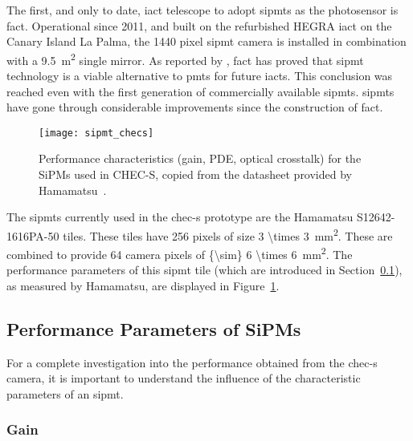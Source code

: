 The first, and only to date, \gls{iact} telescope to adopt \glspl{sipmt} as the photosensor is \gls{fact}. Operational since 2011, and built on the refurbished
HEGRA \gls{iact} on the Canary Island La Palma, the 1440 pixel \gls{sipmt} camera is installed in combination with a \SI{9.5}{m\squared} single mirror. As reported by \textcite{Biland2015}, \gls{fact} has proved that \gls{sipmt} technology is a viable alternative to \glspl{pmt} for future \glspl{iact}. This conclusion was reached even with the first generation of commercially available \glspl{sipmt}. \glspl{sipmt} have gone through considerable improvements since the construction of \gls{fact}.

\begin{figure}
	\centering
    \texttt{[image: sipmt\_checs]} 
	\caption[Performance characteristics for the SiPMs used in CHEC-S.]{Performance characteristics (gain, PDE, optical crosstalk) for the SiPMs used in CHEC-S, copied from the datasheet provided by Hamamatsu~\cite{Hamamatsu2013}.}
	\label{fig:sipmt_checs}
\end{figure}

The \glspl{sipmt} currently used in the \gls{chec-s} prototype are the Hamamatsu S12642-1616PA-50 tiles. These tiles have 256 pixels of size \SI[parse-numbers = false]{3 \times 3}{mm\squared}. These are combined to provide 64 camera pixels of \SI[parse-numbers = false]{{\sim} 6 \times 6}{mm\squared}. The performance parameters of this \gls{sipmt} tile (which are introduced in Section~\ref{section:sipmt_parameters}), as measured by Hamamatsu, are displayed in Figure~\ref{fig:sipmt_checs}.

\subsection{Performance Parameters of SiPMs} \label{section:sipmt_parameters}

For a complete investigation into the performance obtained from the \gls{chec-s} camera, it is important to understand the influence of the characteristic parameters of an \gls{sipmt}.

\subsubsection{Gain}


